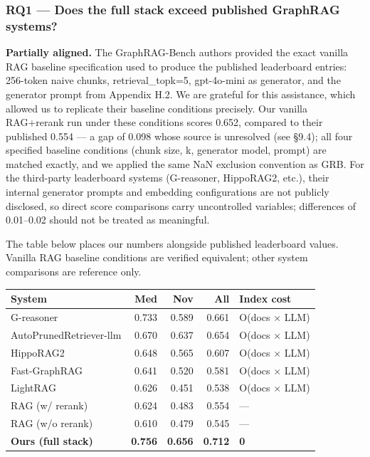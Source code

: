 \documentclass[
]{article}
\begin{document}
\subsubsection{RQ1 --- Does the full stack exceed published GraphRAG
systems?}\label{rq1-does-the-full-stack-exceed-published-graphrag-systems}

\textbf{Partially aligned.} The GraphRAG-Bench authors provided the
exact vanilla RAG baseline specification used to produce the published
leaderboard entries: 256-token naive chunks, retrieval\_topk=5,
gpt-4o-mini as generator, and the generator prompt from Appendix H.2. We
are grateful for this assistance, which allowed us to replicate their
baseline conditions precisely. Our vanilla RAG+rerank run under these
conditions scores 0.652, compared to their published 0.554 --- a gap of
0.098 whose source is unresolved (see §9.4); all four specified baseline
conditions (chunk size, k, generator model, prompt) are matched exactly,
and we applied the same NaN exclusion convention as GRB. For the
third-party leaderboard systems (G-reasoner, HippoRAG2, etc.), their
internal generator prompts and embedding configurations are not publicly
disclosed, so direct score comparisons carry uncontrolled variables;
differences of 0.01--0.02 should not be treated as meaningful.

The table below places our numbers alongside published leaderboard
values. Vanilla RAG baseline conditions are verified equivalent; other
system comparisons are reference only.

\begin{small}
\setlength{\tabcolsep}{4pt}
\begin{longtable}{p{2.0in}rrrp{1.5in}}
\toprule
\textbf{System} & \textbf{Med} & \textbf{Nov} & \textbf{All} & \textbf{Index cost} \\
\midrule
\endhead
G-reasoner & 0.733 & 0.589 & 0.661 & O(docs $\times$ LLM) \\
AutoPrunedRetriever-llm & 0.670 & 0.637 & 0.654 & O(docs $\times$ LLM) \\
HippoRAG2 & 0.648 & 0.565 & 0.607 & O(docs $\times$ LLM) \\
Fast-GraphRAG & 0.641 & 0.520 & 0.581 & O(docs $\times$ LLM) \\
LightRAG & 0.626 & 0.451 & 0.538 & O(docs $\times$ LLM) \\
RAG (w/ rerank) & 0.624 & 0.483 & 0.554 & — \\
RAG (w/o rerank) & 0.610 & 0.479 & 0.545 & — \\
\textbf{Ours (full stack)} & \textbf{0.756} & \textbf{0.656} & \textbf{0.712} & \textbf{0} \\
\bottomrule
\end{longtable}
\end{small}
\end{document}
